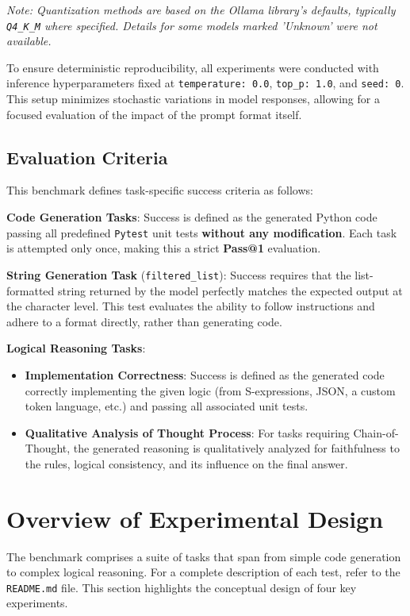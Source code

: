 \documentclass[11pt]{article}
\begin{document}
\emph{Note: Quantization methods are based on the Ollama library's defaults, typically \texttt{Q4\_K\_M} where specified. Details for some models marked 'Unknown' were not available.}

To ensure deterministic reproducibility, all experiments were conducted with inference hyperparameters fixed at \texttt{temperature: 0.0}, \texttt{top\_p: 1.0}, and \texttt{seed: 0}. This setup minimizes stochastic variations in model responses, allowing for a focused evaluation of the impact of the prompt format itself.

\subsection{Evaluation Criteria}
This benchmark defines task-specific success criteria as follows:

\textbf{Code Generation Tasks}: Success is defined as the generated Python code passing all predefined \texttt{Pytest} unit tests \textbf{without any modification}. Each task is attempted only once, making this a strict \textbf{Pass@1} evaluation.

\textbf{String Generation Task} (\texttt{filtered\_list}): Success requires that the list-formatted string returned by the model perfectly matches the expected output at the character level. This test evaluates the ability to follow instructions and adhere to a format directly, rather than generating code.

\textbf{Logical Reasoning Tasks}:
\begin{itemize}
    \item \textbf{Implementation Correctness}: Success is defined as the generated code correctly implementing the given logic (from S-expressions, JSON, a custom token language, etc.) and passing all associated unit tests.
    \item \textbf{Qualitative Analysis of Thought Process}: For tasks requiring Chain-of-Thought, the generated reasoning is qualitatively analyzed for faithfulness to the rules, logical consistency, and its influence on the final answer.
\end{itemize}

\section{Overview of Experimental Design}
\label{sec:design}

The benchmark comprises a suite of tasks that span from simple code generation to complex logical reasoning. For a complete description of each test, refer to the \texttt{README.md} file. This section highlights the conceptual design of four key experiments.
\end{document}
